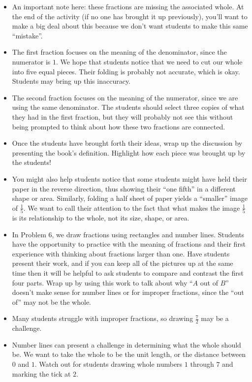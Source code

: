 \documentclass{ximera}
\begin{document}
\begin{instructorNotes}
\begin{itemize}
	\item An important note here: these fractions are missing the associated whole. At the end of the activity (if no one has brought it up previously), you'll want to make a big deal about this because we don't want students to make this same ``mistake''.
	\item The first fraction focuses on the meaning of the denominator, since the numerator is $1$. We hope that students notice that we need to cut our whole into five equal pieces. Their folding is probably not accurate, which is okay. Students may bring up this inaccuracy.
	\item The second fraction focuses on the meaning of the numerator, since we are using the same denominator. The students should select three copies of what they had in the first fraction, but they will probably not see this without being prompted to think about how these two fractions are connected.
	\item Once the students have brought forth their ideas, wrap up the discussion by presenting the book's definition. Highlight how each piece was brought up by the students!
	\item You might also help students notice that some students might have held their paper in the reverse direction, thus showing their ``one fifth'' in a different shape or area.  Similarly, folding a half sheet of paper yields a ``smaller'' image of $\frac15$.  We want to call their attention to the fact that what makes the image $\frac15$ is its relationship to the whole, not its size, shape, or area.
	\item In Problem 6, we draw fractions using rectangles and number lines. Students have the opportunity to practice with the meaning of fractions and their first experience with thinking about fractions larger than one. Have students present their work, and if you can keep all of the pictures up at the same time then it will be helpful to ask students to compare and contrast the first four parts. Wrap up by using this work to talk about why ``$A$ out of $B$'' doesn't make sense for number lines or for improper fractions, since the ``out of'' may not be the whole. 
	\item Many students struggle with improper fractions, so drawing $\frac{7}{2}$ may be a challenge.
	\item Number lines can present a challenge in determining what the whole should be. We want to take the whole to be the unit length, or the distance between $0$ and $1$. Watch out for students drawing whole numbers $1$ through $7$ and marking the tick at $2$.

\end{itemize}
\end{instructorNotes}
\end{document}
